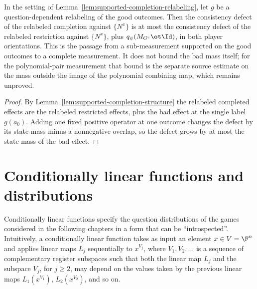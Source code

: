 	\begin{lemma}
		\label{lem:supported-completion-restriction}
		\leanok
		In the setting of Lemma~\ref{lem:supported-completion-relabeling}, let
		$g$ be a question-dependent relabeling of the good outcomes. Then the
		consistency defect of the relabeled completion against $\{N^x\}$ is at
		most the consistency defect of the relabeled restriction against
		$\{N^x\}$, plus $q_\psi(M_{G^c} \ot \Id)$, in both player orientations.
		This is the passage from a sub-measurement supported on the good
		outcomes to a complete measurement. It does not bound the bad mass
		itself; for the polynomial-pair measurement that bound is the separate
		source estimate on the mass outside the image of the polynomial
		combining map, which remains unproved.
	\end{lemma}
	\begin{proof}
		\leanok
		By Lemma~\ref{lem:supported-completion-structure} the relabeled
		completed effects are the relabeled restricted effects, plus the bad
		effect at the single label $g(a_0)$. Adding one fixed positive operator
		at one outcome changes the defect by its state mass minus a nonnegative
		overlap, so the defect grows by at most the state mass of the bad
		effect.
	\end{proof}

\section{Conditionally linear functions and distributions}
\label{sec:cl}

Conditionally linear functions specify the question distributions of the games considered in the following chapters in a form that can be ``introspected''. Intuitively, a conditionally linear function takes as input an element $x \in V = \F^n$ and applies linear maps $L_j$ sequentially to $x^{V_j}$, where $V_1, V_2, \dots$ is a sequence of complementary register subspaces such that both the linear map $L_j$ and the subspace $V_j$, for $j \ge 2$, may depend on the values taken by the previous linear maps $L_1(x^{V_1})$, $L_2(x^{V_2})$, and so on.

